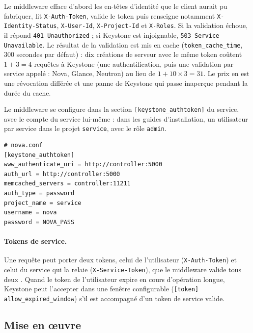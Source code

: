 Le middleware efface d'abord les en-têtes d'identité que le client aurait pu fabriquer, lit \texttt{X-Auth-Token}, valide le token puis
renseigne notamment \texttt{X-Identity-Status}, \texttt{X-User-Id}, \texttt{X-Project-Id} et \texttt{X-Roles}. Si la validation échoue, il
répond \texttt{401 Unauthorized} ; si Keystone est injoignable, \texttt{503 Service Unavailable}. Le résultat de la validation est mis en
cache (\texttt{token\_cache\_time}, 300 secondes par défaut) : dix créations de serveur avec le même token coûtent $1+3=4$ requêtes à
Keystone (une authentification, puis une validation par service appelé : Nova, Glance, Neutron) au lieu de $1+10\times3=31$. Le prix en
est une révocation différée et une panne de Keystone qui passe inaperçue pendant la durée du cache.

Le middleware se configure dans la section \texttt{[keystone\_authtoken]} du service, avec le compte du service lui-même : dans les
guides d'installation, un utilisateur par service dans le projet \texttt{service}, avec le rôle \texttt{admin}.

\par\noindent\begin{minipage}{\linewidth}
\begin{lstlisting}
# nova.conf
[keystone_authtoken]
www_authenticate_uri = http://controller:5000
auth_url = http://controller:5000
memcached_servers = controller:11211
auth_type = password
project_name = service
username = nova
password = NOVA_PASS
\end{lstlisting}
\end{minipage}\par

\paragraph{Tokens de service.} Une requête peut porter deux tokens, celui de l'utilisateur (\texttt{X-Auth-Token}) et celui du service qui la
relaie (\texttt{X-Service-Token}), que le middleware valide tous deux \parencite{keystonemiddleware}. Quand le token de l'utilisateur expire en cours
d'opération longue, Keystone peut l'accepter dans une fenêtre configurable (\texttt{[token] allow\_expired\_window}) s'il est
accompagné d'un token de service valide.

\subsection{Mise en œuvre}\label{sec:ks-deploiement}

